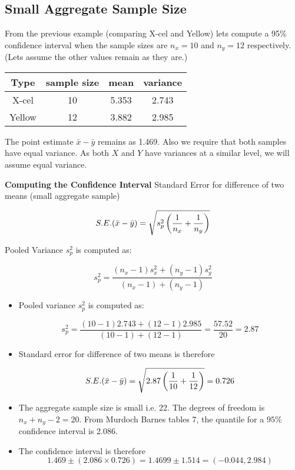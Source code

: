 \documentclass[a4paper,12pt]{article}
\begin{document}
\subsection*{Small Aggregate Sample Size}
From the previous example (comparing X-cel and Yellow) lets compute a 95\% confidence interval when the sample sizes are $n_x=10$ and $n_y=12$ respectively. (Lets assume the other values remain as they are.)
\begin{center}
	\begin{tabular}{|c|c|c|c|}
		\hline
		Type & sample size & mean & variance \\ \hline
		X-cel & 10 & 5.353 & 2.743 \\ \hline
		Yellow & 12 & 3.882 & 2.985 \\ \hline
	\end{tabular}
\end{center}
The point estimate $\bar{x} - \bar{y}$ remains as 1.469. Also we require that both samples have equal variance. As both $X$ and $Y$ have variances at a similar level, we will assume equal variance.
\begin{framed}
\noindent \textbf{Computing the Confidence Interval}
Standard Error for difference of two means (small aggregate sample)

\[ S.E.(\bar{x}-\bar{y}) = \sqrt{  s^2_p \left({1\over n_x}+{1\over n_y} \right)} \]

Pooled Variance $s^2_p$ is computed as:

\[ s^2_p = \frac{(n_x-1)s^2_x + (n_y-1)s^2_y}{(n_x-1) + (n_y-1)} \]
\end{framed}



\begin{itemize} \item Pooled variance $s^2_p$ is computed as:
	
	\[ s^2_p = \frac{(10-1)2.743 + (12-1)2.985}{(10-1) + (12-1)}  = \frac{57.52}{20} = 2.87\]
	
	\item Standard error for difference of two means is therefore
	
	\[ S.E.(\bar{x}-\bar{y}) = \sqrt{  2.87 \left({1\over 10}+{1\over 12} \right)} = 0.726 \]
	
	\item The aggregate sample size is small i.e. 22. The degrees of freedom is $n_x+n_y-2 = 20$.
	From Murdoch Barnes tables 7, the quantile for a $95\%$ confidence interval is 2.086.
	
	\item The confidence interval is therefore
	\[ 1.469  \pm (2.086 \times 0.726) = 1.4699 \pm 1.514 =  (-0.044, 2.984 )  \]
\end{itemize}


\end{document}
